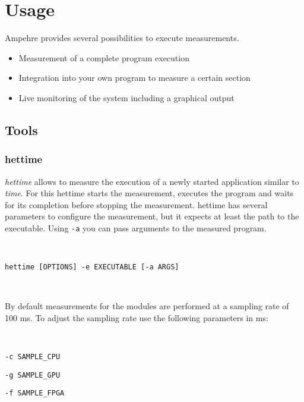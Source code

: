 %
%
%
%
%
%

\section{Usage}

Ampehre provides several possibilities to execute measurements.
\begin{itemize}
\item Measurement of a complete program execution
\item Integration into your own program to measure a certain section
\item Live monitoring of the system including a graphical output
\end{itemize}

\subsection{Tools}

\subsubsection{hettime}
\emph{hettime} allows to measure the execution of a newly started application similar to \emph{time}.
For this hettime starts the measurement, executes the program and waits for its completion before stopping the measurement.
hettime has several parameters to configure the measurement, but it expects at least the path to the executable.
Using \verb+-a+ you can pass arguments to the measured program.

~

\verb+hettime [OPTIONS] -e EXECUTABLE [-a ARGS]+

~

By default measurements for the modules are performed at a sampling rate of 100 ms.
To adjust the sampling rate use the following parameters in ms:

~

\verb+-c SAMPLE_CPU+

\verb+-g SAMPLE_GPU+

\verb+-f SAMPLE_FPGA+

